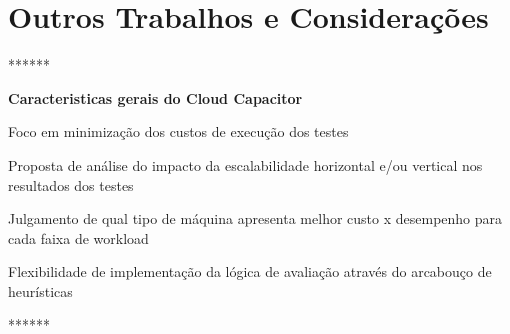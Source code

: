 \section{Outros Trabalhos e Considerações}

******

\textbf{Caracteristicas gerais do Cloud Capacitor}

Foco em minimização dos custos de execução dos testes

Proposta de análise do impacto da escalabilidade horizontal e/ou vertical nos 
resultados dos testes

Julgamento de qual tipo de máquina apresenta melhor custo x desempenho para cada
faixa de workload

Flexibilidade de implementação da lógica de avaliação através do arcabouço de
heurísticas

******

